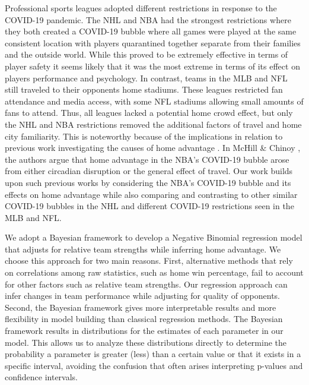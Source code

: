 Professional sports leagues adopted different restrictions in response to the COVID-19 pandemic. The NHL and NBA had the strongest restrictions where they both created a COVID-19 bubble where all games were played at the same consistent location with players quarantined together separate from their families and the outside world. While this proved to be extremely effective in terms of player safety \cite{nhl2020} \cite{usatoday2020} it seems likely that it was the most extreme in terms of its effect on players performance and psychology. In contrast, teams in the MLB and NFL still traveled to their opponents home stadiums. These leagues restricted fan attendance and media access, with some NFL stadiums allowing small amounts of fans to attend. Thus, all leagues lacked a potential home crowd effect, but only the NHL and NBA restrictions removed the additional factors of travel and home city familiarity. This is noteworthy because of the implications in relation to previous work investigating the causes of home advantage  \cite{Unkelbach2010} \cite{Buraimo2010} \cite{Courneya1992} \cite{Carron2005} \cite{McHill2020} \cite{Garicano2005} \cite{Moskowitz2012}. In McHill \& Chinoy \cite{McHill2020}, the authors argue that home advantage in the NBA's COVID-19 bubble arose from either circadian disruption or the general effect of travel. Our work builds upon such previous works by considering the NBA's COVID-19 bubble and its effects on home advantage while also comparing and contrasting to other similar COVID-19 bubbles in the NHL and different COVID-19 restrictions seen in the MLB and NFL.

We adopt a Bayesian framework to develop a Negative Binomial regression model that adjusts for relative team strengths while inferring home advantage. We choose this approach for two main reasons. First, alternative methods that rely on correlations among raw statistics, such as home win percentage, fail to account for other factors such as relative team strengths. Our regression approach can infer changes in team performance while adjusting for quality of opponents. Second, the Bayesian framework gives more interpretable results and more flexibility in model building than classical regression methods. The Bayesian framework results in distributions for the estimates of each parameter in our model. This allows us to analyze these distributions directly to determine the probability a parameter is greater (less) than a certain value or that it exists in a specific interval, avoiding the confusion that often arises interpreting p-values and confidence intervals.

